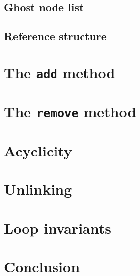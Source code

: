 \documentclass[runningheads]{llncs}
\begin{document}
\subsection{Ghost node list}
\subsection{Reference structure}
\section{The \texttt{add} method}\label{sec:add}
\section{The \texttt{remove} method}\label{sec:remove}
\section{Acyclicity}\label{sec:acyclicity}
\section{Unlinking}\label{sec:unlinking}
\section{Loop invariants}\label{sec:loop-invariant}
\section{Conclusion}



\end{document}
